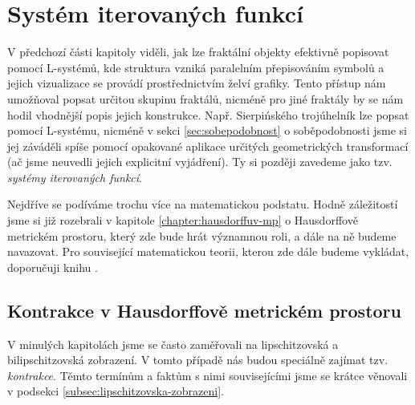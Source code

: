 \section{Systém iterovaných funkcí}\label{sec:ifs}

V předchozí části kapitoly viděli, jak lze fraktální objekty efektivně popisovat pomocí L-systémů, kde struktura vzniká paralelním přepisováním symbolů a jejich vizualizace se provádí prostřednictvím želví grafiky. Tento přístup nám umožňoval popsat určitou skupinu fraktálů, nicméně pro jiné fraktály by se nám hodil vhodnější popis jejich konstrukce. Např. Sierpińského trojúhelník lze popsat pomocí L-systému, nicméně v sekci \ref{sec:sobepodobnost} o soběpodobnosti jsme si jej záváděli spíše pomocí opakované aplikace určitých geometrických transformací (ač jsme neuvedli jejich explicitní vyjádření). Ty si později zavedeme jako tzv. \emph{systémy iterovaných funkcí}.

Nejdříve se podíváme trochu více na matematickou podstatu. Hodně záležitostí jsme si již rozebrali v kapitole \ref{chapter:hausdorffuv-mp} o Hausdorffově metrickém prostoru, který zde bude hrát významnou roli, a dále na ně budeme navazovat. Pro související matematickou teorii, kterou zde dále budeme vykládat, doporučuji knihu \cite{Barnsley1993}.

\subsection{Kontrakce v Hausdorffově metrickém prostoru}\label{subsec:hausdorffuv-mp-kontrakce}

V minulých kapitolách jsme se často zaměřovali na lipschitzovská a bilipschitzovská zobrazení. V tomto případě nás budou speciálně zajímat tzv. \emph{kontrakce}. Těmto termínům a faktům s nimi souvisejícími jsme se krátce věnovali v podsekci \ref{subsec:lipschitzovska-zobrazeni}.


